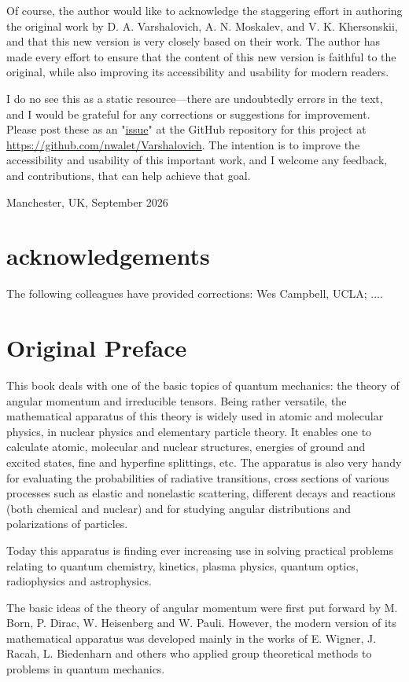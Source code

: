 Of course, the author would like to acknowledge the staggering effort in authoring the original work by D. A. Varshalovich, A. N. Moskalev, and V. K. Khersonskii, and that this new version is very closely based on their work. The author has made every effort to ensure that the content of this new version is faithful to the original, while also improving its accessibility and usability for modern readers.

I do no see this as a static resource---there are undoubtedly errors in the text, and I would be grateful for any corrections or suggestions for improvement. Please post these as an "\href{https://github.com/nwalet/Varshalovich/issues}{issue}" at the GitHub repository for this project at \url{https://github.com/nwalet/Varshalovich}. The intention is to improve the accessibility and usability of this important work, and I welcome any feedback, and contributions, that can help achieve that goal.

Manchester, UK, September 2026 
\section*{acknowledgements}
The following colleagues have provided corrections: Wes Campbell, UCLA; ....

\section*{Original Preface}
This book deals with one of the basic topics of quantum mechanics: the theory of angular momentum and irreducible tensors. Being rather versatile, the mathematical apparatus of this theory is widely used in atomic and molecular physics, in nuclear physics and elementary particle theory. It enables one to calculate atomic, molecular and nuclear structures, energies of ground and excited states, fine and hyperfine splittings, etc. The apparatus is also very handy for evaluating the probabilities of radiative transitions, cross sections of various processes such as elastic and nonelastic scattering, different decays and reactions (both chemical and nuclear) and for studying angular distributions and polarizations of particles.

Today this apparatus is finding ever increasing use in solving practical problems relating to quantum chemistry, kinetics, plasma physics, quantum optics, radiophysics and astrophysics.

The basic ideas of the theory of angular momentum were first put forward by M. Born, P. Dirac, W. Heisenberg and W. Pauli. However, the modern version of its mathematical apparatus was developed mainly in the works of E. Wigner, J. Racah, L. Biedenharn and others who applied group theoretical methods to problems in quantum mechanics.

